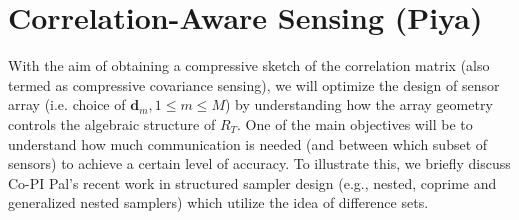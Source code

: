 \documentclass{article}
\begin{document}
\section{Correlation-Aware Sensing (Piya)} 
With the aim of obtaining a compressive sketch of the correlation matrix (also termed as compressive covariance sensing), we will optimize the design of sensor array (i.e. choice of $\mathbf{d}_m, 1\leq m\leq M$) by understanding how the array geometry controls the algebraic structure of $R_T$. One of the main objectives will be to understand how much communication is needed (and between which subset of sensors) to achieve a certain level of accuracy. To illustrate this, we briefly discuss Co-PI Pal's recent work in structured sampler design (e.g., nested, coprime and generalized nested samplers) which utilize the idea of difference sets.
\end{document}
